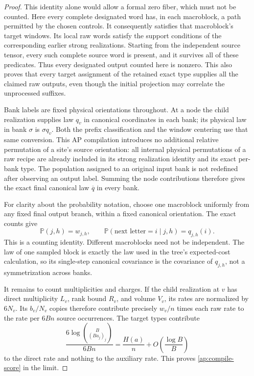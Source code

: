 \documentclass[11pt]{article}
\numberwithin{equation}{section}
\theoremstyle{definition}
\theoremstyle{remark}
\begin{document}
\begin{proof}
This identity alone would allow a formal zero fiber, which must not be
counted.  Here every complete designated word has, in each macroblock,
a path permitted by the chosen controls.  It consequently satisfies that
macroblock's target windows.  Its local raw words satisfy the support
conditions of the corresponding earlier strong realizations.  Starting from
the independent source tensor, every such complete source word is present,
and it survives all of these predicates.  Thus every designated output
counted here is nonzero.  This also proves that every target assignment
of the retained exact type supplies all the claimed raw outputs, even
though the initial projection may correlate the unprocessed suffixes.

Bank labels are fixed physical orientations throughout.  At a node the
child realization supplies law \(q_v\) in canonical coordinates in each
bank; its physical law in bank \(\sigma\) is \(\sigma q_v\).
Both the prefix classification and the window centering use that same
conversion.  This AP compilation introduces no additional relative
permutation of a site's source orientation: all internal physical
permutations of a raw recipe are already included in its strong realization
identity and its exact per-bank type.  The population assigned to an
original input bank is not redefined after observing an output label.
Summing the node contributions therefore gives the exact final canonical
law \(\overline q\) in every bank.

For clarity about the probability notation, choose one macroblock uniformly
from any fixed final output branch, within a fixed canonical orientation.
The exact counts give
\[
 \mathbb P(j,h)=w_{j,h},
 \qquad
 \mathbb P(\text{next letter}=i\mid j,h)=q_{j,h}(i).
\]
This is a counting identity.  Different macroblocks need not be independent.
The law of one sampled block is exactly the law used in the tree's
expected-cost calculation, so its single-step canonical covariance is
the covariance of \(q_{j,h}\), not a symmetrization across banks.

It remains to count multiplicities and charges.  If the child realization
at \(v\) has direct multiplicity \(L_v\), rank bound \(R_v\), and
volume \(V_v\), its rates are normalized by \(6N_v\).  Its
\(b_v/N_v\) copies therefore contribute precisely \(w_v/n\) times
each raw rate to the rate per \(6Bn\) source occurrences.  The target
types contribute
\[
 \frac{6\log\binom B{(Ba_j)_j}}{6Bn}
  =\frac{H(a)}n+O\left(\frac{\log B}{B}\right)
\]
to the direct rate and nothing to the auxiliary rate.  This proves
\eqref{ap:compile-score} in the limit.


\end{proof}
\end{document}
